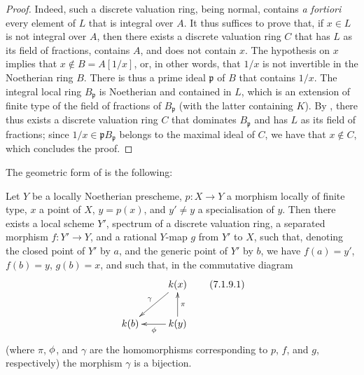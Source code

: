 \begin{proof}
Indeed, such a discrete valuation ring, being normal, contains \emph{a fortiori} every element of $L$ that is integral over $A$.
It thus suffices to prove that, if $x\in L$ is not integral over $A$, then there exists a discrete valuation ring $C$ that has $L$ as its field of fractions, contains $A$, and does not contain $x$.
The hypothesis on $x$ implies that $x\not\in B=A[1/x]$, or, in other words, that $1/x$ is not invertible in the Noetherian ring $B$.
There is thus a prime ideal $\mathfrak{p}$ of $B$ that contains $1/x$.
The integral local ring $B_\mathfrak{p}$ is Noetherian and contained in $L$, which is an extension  of finite type of the field of fractions of $B_\mathfrak{p}$ (with the latter containing $K$).
By , there thus exists a discrete valuation ring $C$ that dominates $B_\mathfrak{p}$ and has $L$ as its field of fractions;
since $1/x\in\mathfrak{p}B_\mathfrak{p}$ belongs to the maximal ideal of $C$, we have that $x\not\in C$, which concludes the proof.
\end{proof}

The geometric form of  is the following:

\begin{proposition}[7.1.9]
\label{II.7.1.9}
Let $Y$ be a locally Noetherian prescheme, $p:X\to Y$ a morphism locally of finite type, $x$ a point of $X$, $y=p(x)$, and $y'\neq y$ a specialisation of $y$.
Then there exists a local scheme $Y'$, spectrum of a discrete valuation ring, a separated morphism $f:Y'\to Y$, and a rational $Y$-map $g$ from $Y'$ to $X$, such that, denoting the closed point of $Y'$ by $a$, and the generic point of $Y'$ by $b$, we have $f(a)=y'$, $f(b)=y$, $g(b)=x$, and such that, in the commutative diagram
\[
\label{II.7.1.9.1}
    \xymatrix{
        & \kres(x) \ar[dl]_{\gamma}
    \\  \kres(b)
        & \kres(y) \ar[u]_{\pi} \ar[l]^{\vphi}
    }
\tag{7.1.9.1}
\]
(where $\pi$, $\phi$, and $\gamma$ are the homomorphisms corresponding to $p$, $f$, and $g$, respectively) the morphism $\gamma$ is a bijection.
\end{proposition}

